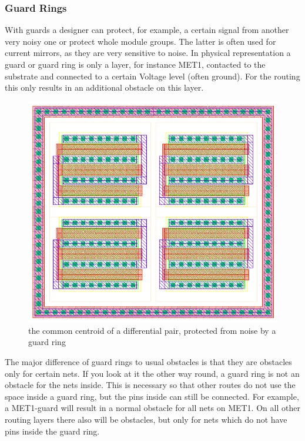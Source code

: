 \subsubsection{Guard Rings}
With guards  a designer can protect, for example, a certain signal from another very noisy one or protect whole module groups. The latter is often used for current mirrors, as they are very sensitive to noise. In physical representation a guard or guard ring is only a layer, for instance MET1, contacted to the substrate and connected to a certain Voltage level (often ground). For the routing this only results in an additional obstacle on this layer.

\begin{figure}
	\centering
	\includegraphics[scale=.6]{FIG/guard_ring.png}
  	\caption{the common centroid of a differential pair, protected from noise by a guard ring}
	\label{fig:guard_ring}
\end{figure}

The major difference of guard rings to usual obstacles is that they are obstacles only for certain nets. If you look at it the other way round, a guard ring is not an obstacle for the nets inside. This is necessary so that other routes do not use the space inside a guard ring, but the pins inside can still be connected. For example, a MET1-guard will result in a normal obstacle for all nets on MET1. On all other routing layers there also will be obstacles, but only for nets which do not have pins inside the guard ring.


